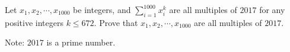 Let $x_{1}, x_{2},\cdots,x_{1000}$ be integers, and $\displaystyle \sum_{i=1}^{1000} x_{i}^{k}$ are all multiples of $2017$ for any positive integers $k \leq 672$. Prove that $x_{1}, x_{2},\cdots,x_{1000}$ are all multiples of $2017$.

Note: $2017$ is a prime number.